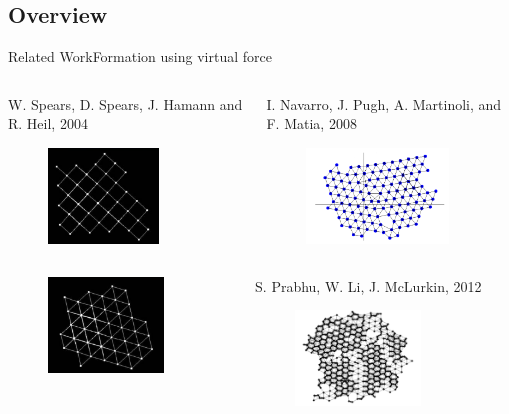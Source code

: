 \subsection[problem]{Overview}
\begin{frame}{Related Work}{Formation using virtual force}
   \begin{columns}[T] 
    \begin{column}{.45\textwidth}
      \scriptsize{W. Spears, D. Spears, J. Hamann and R. Heil, 2004}
      \begin{figure}
        \centering
        \includegraphics[height=1in]{figs/spears1.png}
      \end{figure}
    \end{column}%
    \begin{column}{.45\textwidth}
      \scriptsize{I. Navarro, J. Pugh, A. Martinoli, and
        F. Matia, 2008}
      \begin{figure}
        \centering
        \includegraphics[height=1in]{figs/navarro.png}
      \end{figure}      
    \end{column}
  \end{columns}
  \vspace{3mm}
  \begin{columns}[T] 
    \begin{column}{.45\textwidth}
      \begin{figure}
        \centering
        \includegraphics[height=1in]{figs/spears2.png}     
      \end{figure}  
    \end{column}%
    \begin{column}{.45\textwidth}
      \scriptsize{S. Prabhu, W. Li, J. McLurkin, 2012}
      \begin{figure}
        \centering
        \includegraphics[height=1in]{figs/james.png}
      \end{figure}
    \end{column}
  \end{columns}
\end{frame}

